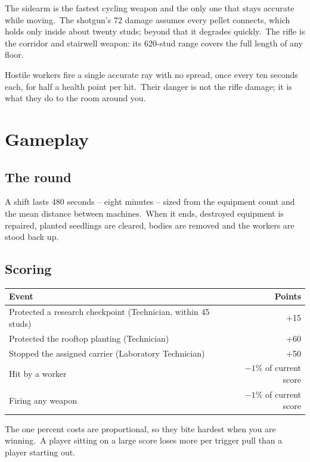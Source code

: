 The sidearm is the fastest cycling weapon and the only one that stays accurate
while moving.\ The shotgun's 72 damage assumes every pellet connects, which
holds only inside about twenty studs; beyond that it degrades quickly.\ The
rifle is the corridor and stairwell weapon: its 620-stud range covers the full
length of any floor.\

Hostile workers fire a single accurate ray with no spread, once every ten
seconds each, for half a health point per hit.\ Their danger is not the rifle
damage; it is what they do to the room around you.\

\section{Gameplay}

\subsection{The round}
A shift lasts 480 seconds -- eight minutes -- sized from the equipment count and
the mean distance between machines.\ When it ends, destroyed equipment is
repaired, planted seedlings are cleared, bodies are removed and the workers are
stood back up.\

\subsection{Scoring}
\begin{center}
\begin{tabular}{@{}lr@{}}
\toprule
\textbf{Event} & \textbf{Points} \\
\midrule
Protected a research checkpoint (Technician, within 45 studs) & +15 \\
Protected the rooftop planting (Technician) & +60 \\
Stopped the assigned carrier (Laboratory Technician) & +50 \\
Hit by a worker & $-1\%$ of current score \\
Firing any weapon & $-1\%$ of current score \\
\bottomrule
\end{tabular}
\end{center}

The one percent costs are proportional, so they bite hardest when you are
winning.\ A player sitting on a large score loses more per trigger pull than a
player starting out.\

